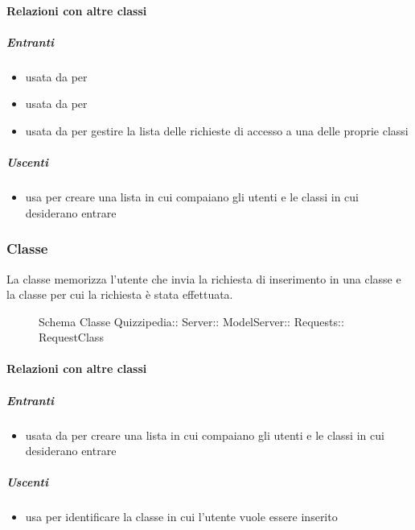 \paragraph{Relazioni con altre classi}
\subparagraph{Entranti}
\begin{itemize}
\item usata da  per 
\item usata da  per 
\item usata da  per gestire la lista delle richieste di accesso a una delle proprie classi
\end{itemize}
\subparagraph{Uscenti}
\begin{itemize}
\item usa  per creare una lista in cui compaiano gli utenti e le classi in cui desiderano entrare
\end{itemize}
\subsubsection{Classe }
La classe memorizza l'utente che invia la richiesta di inserimento in una classe e la classe per cui la richiesta è stata effettuata.
\begin{figure}[H]
\centering
\noindent{}
\caption[Schema Classe RequestClass]{Schema Classe Quizzipedia:: Server:: ModelServer:: Requests:: RequestClass}
\end{figure}
\paragraph{Relazioni con altre classi}
\subparagraph{Entranti}
\begin{itemize}
\item usata da  per creare una lista in cui compaiano gli utenti e le classi in cui desiderano entrare
\end{itemize}
\subparagraph{Uscenti}
\begin{itemize}
\item usa  per identificare la classe
in cui l'utente vuole essere inserito
\end{itemize}
